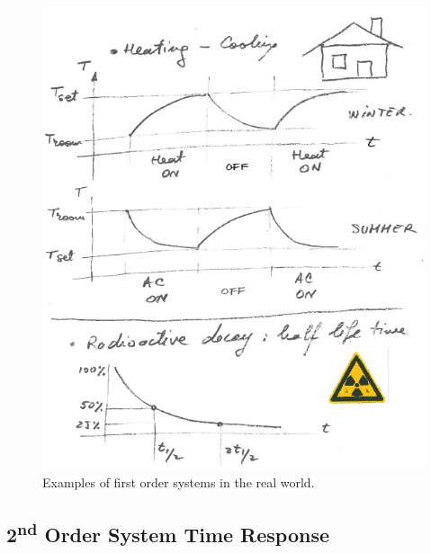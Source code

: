 \documentclass[12pt,letter]{article}
\begin{document}
\begin{figure}[H]
	\centering
	\includegraphics[width=4.5in]{../figures/real_world_first_order_system_response}
	\caption{Examples of first order systems in the real world.}
\end{figure}

%


\subsection{2\textsuperscript{nd} Order System Time Response}
\end{document}
